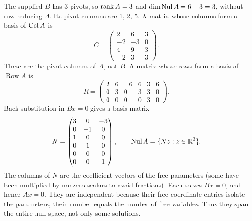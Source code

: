 The supplied $B$ has 3 pivots, so $\operatorname{rank} A=3$ and $\dim\operatorname{Nul} A=6-3=3$, without row reducing $A$. Its pivot columns are 1, 2, 5.
A matrix whose columns form a basis of $\operatorname{Col} A$ is
\[ C=\begin{pmatrix}2&6&3\\-2&-3&0\\4&9&3\\-2&3&3\end{pmatrix}.\]
These are the pivot columns of $A$, not $B$. A matrix whose rows form a basis of $\operatorname{Row}A$ is
\[ R=\begin{pmatrix}2&6&-6&6&3&6\\0&3&0&3&3&0\\0&0&0&0&3&0\end{pmatrix}.\]
Back substitution in $Bx=0$ gives a basis matrix
\[ N=\begin{pmatrix}3&0&-3\\0&-1&0\\1&0&0\\0&1&0\\0&0&0\\0&0&1\end{pmatrix},\qquad\operatorname{Nul} A=\{Nz:z\in\mathbb{R}^{3}\}.\]
The columns of $N$ are the coefficient vectors of the free parameters (some have been multiplied by nonzero scalars to avoid fractions). Each solves $Bx=0$, and hence $Ax=0$. They are independent because their free-coordinate entries isolate the parameters; their number equals the number of free variables. Thus they span the entire null space, not only some solutions.

